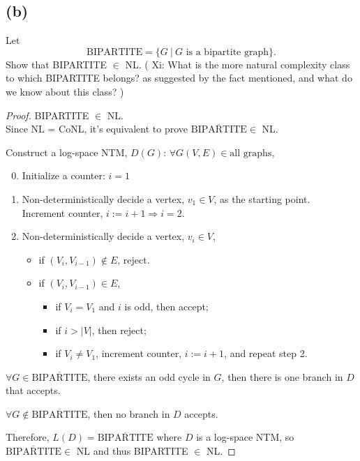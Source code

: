 \documentclass[twoside,11pt]{homework}
\begin{document}
\subsection*{(b)}
\begin{prob}
  Let
  \[
    \text{BIPARTITE} = \{ G \ |\ G \text{ is a bipartite graph} \}.
  \]
  Show that BIPARTITE $\in$ NL.
  ( Xi: What is the more natural complexity class to which BIPARTITE belongs?
    as suggested by the fact mentioned, and what do we know about this class?
  )
\end{prob}

\begin{proof}
  BIPARTITE $\in$ NL.\\

  Since NL = CoNL, it's equivalent to prove $\overline{\text{BIPARTITE}} \in$ NL.

  Construct a log-space NTM, $D(G)$: $\forall G(V,E) \in \text{all graphs}$,
  \begin{enumerate}
  \setcounter{enumi}{-1}
  \item Initialize a counter: $i = 1$
  \item Non-deterministically decide a vertex, $v_1 \in V$, as the starting point.\\
    Increment counter, $i := i + 1 \Rightarrow i = 2$.
  \item Non-deterministically decide a vertex, $v_i \in V$,
    \begin{itemize}
    \item if $(V_i,V_{i-1}) \notin E$, reject.
    \item if $(V_i,V_{i-1}) \in E$,
      \begin{itemize}
      \item if $V_i = V_1$ and $i$ is odd, then accept;
      \item if $i > |V|$, then reject;
      \item if $V_i \ne V_1$, increment counter, $i := i + 1$, and repeat step 2.
      \end{itemize}
    \end{itemize}
  \end{enumerate}

  $\forall G \in \overline{\text{BIPARTITE}}$, there exists an odd cycle in $G$, then
  there is one branch in $D$ that accepts.

  $\forall G \notin \overline{\text{BIPARTITE}}$, then no branch in $D$ accepts.

  Therefore, $L(D) = \overline{\text{BIPARTITE}}$ where $D$ is a log-space NTM,
  so $\overline{\text{BIPARTITE}} \in$ NL and thus BIPARTITE $\in$ NL.

\end{proof}
\end{document}
